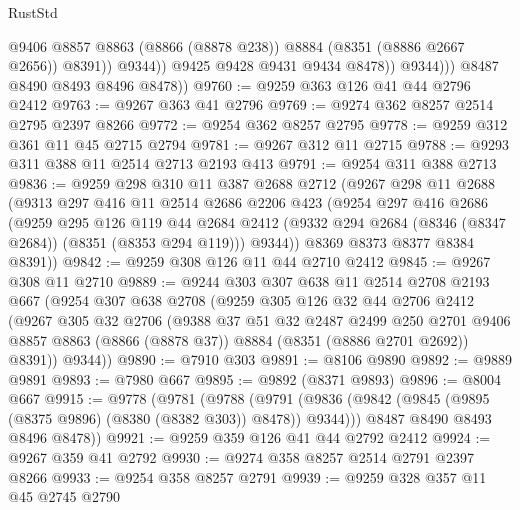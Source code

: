 \begin{lexlean}{RustStd}
\begin{coremodule}
{\begin{coremodule}
{{{{{{{{{{{{{{{{{{{{{{{{{{{{{{{{{{{{{{{{{{{{{{{{{{                          @9406
                          @8857
                          @8863
                          (@8866 (@8878 @238))
                          @8884
                          (@8351 (@8886 @2667 @2656))
                          @8391))
                      @9344))
                  @9425
                  @9428
                  @9431
                  @9434
                  @8478))
              @9344)))
        @8487
        @8490
        @8493
        @8496
        @8478))
@9760 := @9259 @363 @126 @41 @44 @2796 @2412
@9763 := @9267 @363 @41 @2796
@9769 := @9274 @362 @8257 @2514 @2795 @2397 @8266
@9772 := @9254 @362 @8257 @2795
@9778 := @9259 @312 @361 @11 @45 @2715 @2794
@9781 := @9267 @312 @11 @2715
@9788 := @9293 @311 @388 @11 @2514 @2713 @2193 @413
@9791 := @9254 @311 @388 @2713
@9836 := @9259
    @298
    @310
    @11
    @387
    @2688
    @2712
    (@9267
      @298
      @11
      @2688
      (@9313
        @297
        @416
        @11
        @2514
        @2686
        @2206
        @423
        (@9254
          @297
          @416
          @2686
          (@9259
            @295
            @126
            @119
            @44
            @2684
            @2412
            (@9332 @294 @2684 (@8346 (@8347 @2684)) (@8351 (@8353 @294 @119)))
            @9344))
        @8369
        @8373
        @8377
        @8384
        @8391))
@9842 := @9259 @308 @126 @11 @44 @2710 @2412
@9845 := @9267 @308 @11 @2710
@9889 := @9244
    @303
    @307
    @638
    @11
    @2514
    @2708
    @2193
    @667
    (@9254
      @307
      @638
      @2708
      (@9259
        @305
        @126
        @32
        @44
        @2706
        @2412
        (@9267
          @305
          @32
          @2706
          (@9388
            @37
            @51
            @32
            @2487
            @2499
            @250
            @2701
            @9406
            @8857
            @8863
            (@8866 (@8878 @37))
            @8884
            (@8351 (@8886 @2701 @2692))
            @8391))
        @9344))
@9890 := @7910 @303
@9891 := @8106 @9890
@9892 := @9889 @9891
@9893 := @7980 @667
@9895 := @9892 (@8371 @9893)
@9896 := @8004 @667
@9915 := @9778
    (@9781
      (@9788
        (@9791 (@9836 (@9842 (@9845 (@9895 (@8375 @9896) (@8380 (@8382 @303)) @8478)) @9344)))
        @8487
        @8490
        @8493
        @8496
        @8478))
@9921 := @9259 @359 @126 @41 @44 @2792 @2412
@9924 := @9267 @359 @41 @2792
@9930 := @9274 @358 @8257 @2514 @2791 @2397 @8266
@9933 := @9254 @358 @8257 @2791
@9939 := @9259 @328 @357 @11 @45 @2745 @2790
}}}}}}}}}}}}}}}}}}}}}}}}}}}}}}}}}}}}}}}}}}}}}}}}}}
\end{coremodule}}
\end{coremodule}
\end{lexlean}
